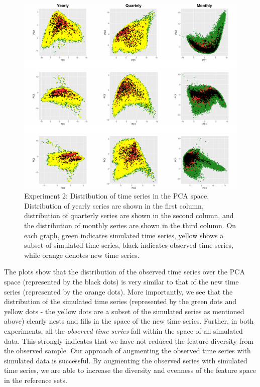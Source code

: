 \documentclass[11pt,a4paper,]{article}
\theoremstyle{definition}
\theoremstyle{definition}
\theoremstyle{definition}
\theoremstyle{remark}
\begin{document}
\begin{figure}

{\centering \includegraphics[width=\textwidth]{figure/exp2pca-1} 

}

\caption{Experiment 2: Distribution of time series in the PCA space. Distribution of yearly series are shown in the first column, distribution of quarterly series are shown in the second column, and the distribution of monthly series are shown in the third column. On each graph, green indicates simulated time series, yellow shows a subset of simulated time series, black indicates observed time series, while orange denotes new time series.}\label{fig:exp2pca}
\end{figure}

The plots show that the distribution of the observed time series over
the PCA space (represented by the black dots) is very similar to that of
the new time series (represented by the orange dots). More importantly,
we see that the distribution of the simulated time series (represented
by the green dots and yellow dots - the yellow dots are a subset of the
simulated series as mentioned above) clearly nests and fills in the
space of the new time series. Further, in both experiments, all the
\emph{observed time series} fall within the space of all simulated data.
This strongly indicates that we have not reduced the feature diversity
from the observed sample. Our approach of augmenting the observed time
series with simulated data is successful. By augmenting the observed
series with simulated time series, we are able to increase the diversity
and evenness of the feature space in the reference sets.
\end{document}
